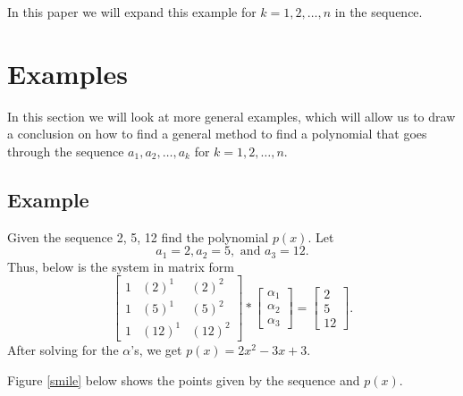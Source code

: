 \documentclass[12pt]{amsart}
\begin{document}
In this paper we will expand this example for $k=1, 2,\hdots, n$ in the sequence.
\section{Examples}
In this section we will look at more general examples, which will allow us to draw a conclusion on how to find a general method to find a polynomial that goes through the sequence $a_1, a_2,\hdots, a_k$ for $k=1, 2,\hdots,n$.
\subsection{Example}
Given the sequence 2, 5, 12 find the polynomial $p(x)$. Let
\begin{equation*}
a_1=2, a_2=5, \text{ and }a_3=12.
\end{equation*}
Thus, below is the system in matrix form \begin{equation*}
\left[ {\begin{array}{ccc}
1&(2)^1 & (2)^2 \\
1&(5)^1 & (5)^2 \\
1&(12)^1 & (12)^2
\end{array} } \right]*
\left[ {\begin{array}{c}
\alpha_1 \\
\alpha_2 \\
\alpha_3
\end{array} } \right]=
\left[ {\begin{array}{c}
2\\
5\\
12
\end{array} } \right].
\end{equation*}
After solving for the $\alpha$'s, we get $p(x)=2x^2-3x+3$.
 
Figure \ref{smile} below shows the points given by the sequence and $p(x)$.
 
 
 
 
\end{document}
